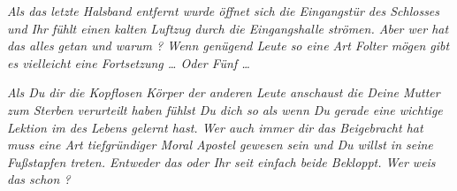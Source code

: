 {\itshape Als das letzte Halsband entfernt wurde öffnet sich die Eingangstür des Schlosses und Ihr fühlt einen kalten Luftzug durch die Eingangshalle strömen. Aber wer hat das alles getan und warum ? Wenn genügend Leute so eine Art Folter mögen gibt es vielleicht eine Fortsetzung … Oder Fünf … }

{\itshape Als Du dir die Kopflosen Körper der anderen Leute anschaust die Deine Mutter zum Sterben verurteilt haben fühlst Du dich so als wenn Du gerade eine wichtige Lektion im des Lebens gelernt hast. Wer auch immer dir das Beigebracht hat muss eine Art tiefgründiger Moral Apostel gewesen sein und Du willst in seine Fußstapfen treten. Entweder das oder Ihr seit einfach beide Bekloppt. Wer weis das schon ?}